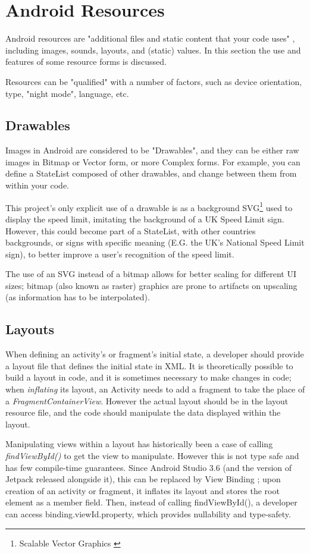 \documentclass[11pt, a4paper, notitlepage]{report}
\begin{document}
\section{Android Resources}
Android resources are "additional files and static content that your code uses" \citep{resourcesAndroid}, including images, sounds, layouts, and (static) values. In this section the use and features of some resource forms is discussed.

Resources can be "qualified" with a number of factors, such as device orientation, type, "night mode", language, etc.

\subsection{Drawables}
Images in Android are considered to be "Drawables", and they can be either raw images in Bitmap or Vector form, or more Complex forms. For example, you can define a StateList composed of other drawables, and change between them from within your code.

This project's only explicit use of a drawable is as a background SVG\footnote{Scalable Vector Graphics \citep{SVGW3C}} used to display the speed limit, imitating the background of a UK Speed Limit sign. However, this could become part of a StateList, with other countries backgrounds, or signs with specific meaning (E.G. the UK's National Speed Limit sign), to better improve a user's recognition of the speed limit.

The use of an SVG instead of a bitmap allows for better scaling for different UI sizes; bitmap (also known as raster) graphics are prone to artifacts on upscaling (as information has to be interpolated).

\subsection{Layouts}
When defining an activity's or fragment's initial state, a developer should provide a layout file that defines the initial state in XML. It is theoretically possible to build a layout in code, and it is sometimes necessary to make changes in code; when \textit{inflating} its layout, an Activity needs to add a fragment to take the place of a \textit{FragmentContainerView}. However the actual layout should be in the layout resource file, and the code should manipulate the data displayed within the layout.

Manipulating views within a layout has historically been a case of calling \textit{findViewById()} to get the view to manipulate. However this is not type safe and has few compile-time guarantees. Since Android Studio 3.6 (and the version of Jetpack released alongside it), this can be replaced by View Binding \citep{viewBindingAndroid}; upon creation of an activity or fragment, it inflates its layout and stores the root element as a member field. Then, instead of calling findViewById(), a developer can access binding.viewId.property, which provides nullability and type-safety.
\end{document}
